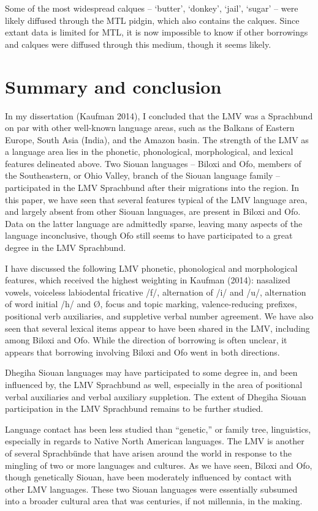\documentclass[output=paper]{LSP/langsci}
\begin{document}
	Some of the most widespread calques -- `butter', `donkey', `jail', `sugar' -- were likely diffused through the MTL pidgin, which also contains the calques. Since extant data is limited for MTL, it is now impossible to know if other borrowings and calques were diffused through this medium, though it seems likely.

\section{Summary and conclusion}
	
In my dissertation (Kaufman 2014), I concluded that the LMV was a Sprachbund on par with other well-known language areas, such as the Balkans of Eastern Europe, South Asia (India), and the Amazon basin. The strength of the LMV as a language area lies in the phonetic, phonological, morphological, and lexical features delineated above. Two Siouan languages -- Biloxi and Ofo, members of the Southeastern, or Ohio Valley, branch of the Siouan language family -- participated in the LMV Sprachbund after their migrations into the region. In this paper, we have seen that several features typical of the LMV language area, and largely absent from other Siouan languages, are present in Biloxi and Ofo. Data on the latter language are admittedly sparse, leaving many aspects of the language inconclusive, though Ofo still seems to have participated to a great degree in the LMV Sprachbund. 

I have discussed the following LMV phonetic, phonological and morphological features, which received the highest weighting in Kaufman (2014): nasalized vowels, voiceless labiodental fricative /f/, alternation of /i/ and /u/, alternation of word initial /h/ and Ø, focus and topic marking, valence-reducing prefixes, positional verb auxiliaries, and suppletive verbal number agreement. We have also seen that several lexical items appear to have been shared in the LMV, including among Biloxi and Ofo. While the direction of borrowing is often unclear, it appears that borrowing involving Biloxi and Ofo went in both directions.

Dhegiha Siouan languages may have participated to some degree in, and been influenced by, the LMV Sprachbund as well, especially in the area of positional verbal auxiliaries and verbal auxiliary suppletion. The extent of Dhegiha Siouan participation in the LMV Sprachbund remains to be further studied.

Language contact has been less studied than “genetic,” or family tree, linguistics, especially in regards to Native North American languages. The LMV is another of several Sprachbünde that have arisen around the world in response to the mingling of two or more languages and cultures. As we have seen, Biloxi and Ofo, though genetically Siouan, have been moderately influenced by contact with other LMV languages. These two Siouan languages were essentially subsumed into a broader cultural area that was centuries, if not millennia, in the making. 
\end{document}

